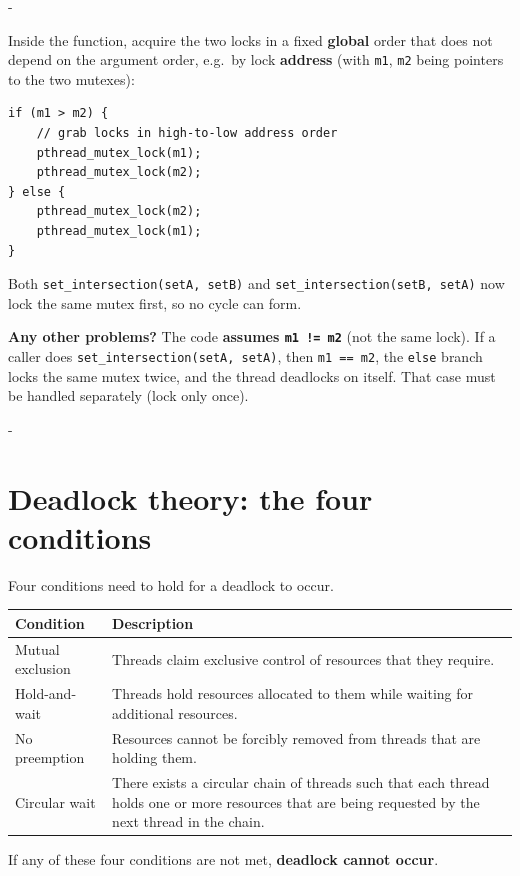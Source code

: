 \documentclass[11pt,a4paper]{article}
\makeatletter
\newcommand{\keepspace}[1]{\par\penalty-100\begingroup
  \setlength{\dimen@}{#1}\dimen@ii\pagegoal\advance\dimen@ii-\pagetotal
  \ifdim\dimen@>\dimen@ii\ifdim\dimen@ii>\z@\vfil\fi\break\fi\endgroup}
\makeatother
\begin{document}
\keepspace{22\baselineskip}
\begin{solbox}[Solution?]
Inside the function, acquire the two locks in a fixed \textbf{global} order
that does not depend on the argument order, e.g.\ by lock \textbf{address}
(with \texttt{m1}, \texttt{m2} being pointers to the two mutexes):
\begin{lstlisting}[numbers=none]
if (m1 > m2) {
    // grab locks in high-to-low address order
    pthread_mutex_lock(m1);
    pthread_mutex_lock(m2);
} else {
    pthread_mutex_lock(m2);
    pthread_mutex_lock(m1);
}
\end{lstlisting}
Both \texttt{set\_intersection(setA, setB)} and
\texttt{set\_intersection(setB, setA)} now lock the same mutex first, so no
cycle can form.

\textbf{Any other problems?} The code \textbf{assumes \texttt{m1 != m2}}
(not the same lock). If a caller does \texttt{set\_intersection(setA, setA)},
then \texttt{m1 == m2}, the \texttt{else} branch locks the same mutex twice,
and the thread deadlocks on itself. That case must be handled separately
(lock only once).
\end{solbox}

\keepspace{16\baselineskip}
\section{Deadlock theory: the four conditions}

\begin{keybox}
Four conditions need to hold for a deadlock to occur.

\smallskip
\renewcommand{\arraystretch}{1.25}
\begin{tabularx}{\linewidth}{@{}lX@{}}
  \toprule
  \textbf{Condition} & \textbf{Description} \\
  \midrule
  Mutual exclusion & Threads claim exclusive control of resources that they require. \\
  Hold-and-wait & Threads hold resources allocated to them while waiting for additional resources. \\
  No preemption & Resources cannot be forcibly removed from threads that are holding them. \\
  Circular wait & There exists a circular chain of threads such that each thread holds one or more resources that are being requested by the next thread in the chain. \\
  \bottomrule
\end{tabularx}

\smallskip
If any of these four conditions are not met, \textbf{deadlock cannot occur}.
\end{keybox}
\end{document}
